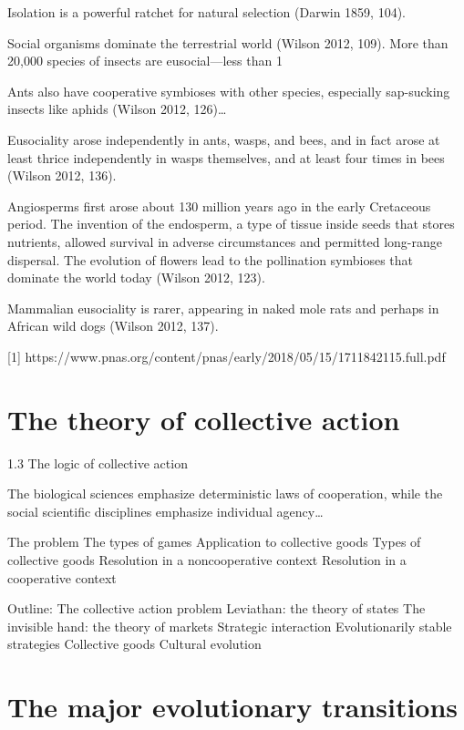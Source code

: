 \documentclass{tufte-book} %
\begin{document}
Isolation is a powerful ratchet for natural selection (Darwin 1859, 104).

Social organisms dominate the terrestrial world (Wilson 2012, 109). More than 20,000 species of insects are eusocial—less than 1%

Ants also have cooperative symbioses with other species, especially sap-sucking insects like aphids (Wilson 2012, 126)…

Eusociality arose independently in ants, wasps, and bees, and in fact arose at least thrice independently in wasps themselves, and at least four times in bees (Wilson 2012, 136). 

Angiosperms first arose about 130 million years ago in the early Cretaceous period. The invention of the endosperm, a type of tissue inside seeds that stores nutrients, allowed survival in adverse circumstances and permitted long-range dispersal. The evolution of flowers lead to the pollination symbioses that dominate the world today (Wilson 2012, 123).

Mammalian eusociality is rarer, appearing in naked mole rats and perhaps in African wild dogs (Wilson 2012, 137).  



[1] https://www.pnas.org/content/pnas/early/2018/05/15/1711842115.full.pdf

\section{The theory of collective action}\label{collective-action}

1.3 The logic of collective action

The biological sciences emphasize deterministic laws of cooperation, while the social scientific disciplines emphasize individual agency…


The problem
The types of games
Application to collective goods
Types of collective goods
Resolution in a noncooperative context
Resolution in a cooperative context

Outline:
The collective action problem
Leviathan: the theory of states
The invisible hand: the theory of markets
Strategic interaction
Evolutionarily stable strategies
Collective goods
Cultural evolution


\section{The major evolutionary transitions}
\end{document}
